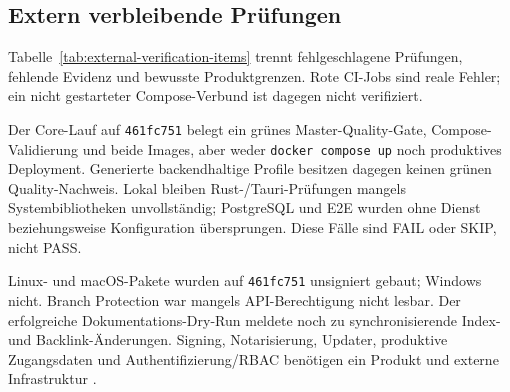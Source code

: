 \subsection{Extern verbleibende Prüfungen}
\label{subsec:extern-verbleibende-pruefungen}

Tabelle~\ref{tab:external-verification-items} trennt fehlgeschlagene Prüfungen,
fehlende Evidenz und bewusste Produktgrenzen. Rote CI-Jobs sind reale Fehler;
ein nicht gestarteter Compose-Verbund ist dagegen nicht verifiziert.

Der Core-Lauf auf \texttt{461fc751} belegt ein grünes Master-Quality-Gate,
Compose-Validierung und beide Images, aber weder
\texttt{docker compose up} noch produktives Deployment. Generierte
backendhaltige Profile besitzen dagegen keinen grünen Quality-Nachweis. Lokal
bleiben Rust-/Tauri-Prüfungen mangels Systembibliotheken unvollständig;
PostgreSQL und E2E wurden ohne Dienst beziehungsweise Konfiguration
übersprungen. Diese Fälle sind FAIL oder SKIP, nicht PASS.

Linux- und macOS-Pakete wurden auf \texttt{461fc751} unsigniert gebaut;
Windows nicht. Branch Protection war mangels API-Berechtigung nicht lesbar.
Der erfolgreiche Dokumentations-Dry-Run meldete noch zu synchronisierende
Index- und Backlink-Änderungen. Signing, Notarisierung, Updater, produktive
Zugangsdaten und Authentifizierung/RBAC benötigen ein Produkt und externe
Infrastruktur
\parencite{kleiveist2026governance-core-run,kleiveist2026governance-desktop-run,kleiveist2026release}.


